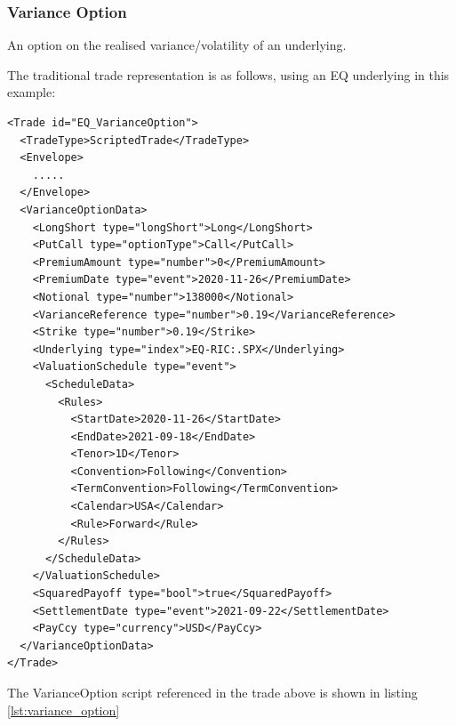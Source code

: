 \subsubsection{Variance Option}

An option on the realised variance/volatility of an underlying.

The traditional trade representation is as follows, using an EQ underlying in this example:

\begin{verbatim}
<Trade id="EQ_VarianceOption">
  <TradeType>ScriptedTrade</TradeType>
  <Envelope>
    .....
  </Envelope>
  <VarianceOptionData>
    <LongShort type="longShort">Long</LongShort>
    <PutCall type="optionType">Call</PutCall>
    <PremiumAmount type="number">0</PremiumAmount>
    <PremiumDate type="event">2020-11-26</PremiumDate>
    <Notional type="number">138000</Notional>
    <VarianceReference type="number">0.19</VarianceReference>
    <Strike type="number">0.19</Strike>
    <Underlying type="index">EQ-RIC:.SPX</Underlying>
    <ValuationSchedule type="event">
      <ScheduleData>
        <Rules>
          <StartDate>2020-11-26</StartDate>
          <EndDate>2021-09-18</EndDate>
          <Tenor>1D</Tenor>
          <Convention>Following</Convention>
          <TermConvention>Following</TermConvention>
          <Calendar>USA</Calendar>
          <Rule>Forward</Rule>
        </Rules>
      </ScheduleData>
    </ValuationSchedule>
    <SquaredPayoff type="bool">true</SquaredPayoff>
    <SettlementDate type="event">2021-09-22</SettlementDate>
    <PayCcy type="currency">USD</PayCcy>
  </VarianceOptionData>
</Trade>
\end{verbatim}

The VarianceOption script referenced in the trade above is shown in listing
\ref{lst:variance_option}

